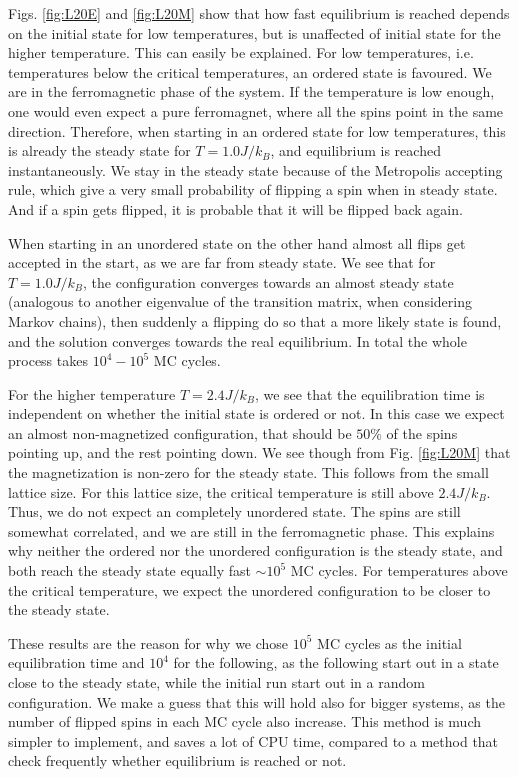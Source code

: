 \documentclass[%
 reprint,
nofootinbib,
aps,
]{revtex4-1}
\begin{document}
Figs. \ref{fig:L20E} and \vref{fig:L20M} show that how fast equilibrium is reached depends on the initial state for low temperatures, but is unaffected of initial state for the higher temperature. This can easily be explained. For low temperatures, i.e. temperatures below the critical temperatures, an ordered state is favoured. We are in the ferromagnetic phase of the system. If the temperature is low enough, one would even expect a pure ferromagnet, where all the spins point in the same direction. Therefore, when starting in an ordered state for low temperatures, this is already the steady state for $T = 1.0J/k_B$, and equilibrium is reached instantaneously. We stay in the steady state because of the Metropolis accepting rule, which  give a very small probability of flipping a spin when in steady state. And if a spin gets flipped, it is probable that it will be flipped back again. 

When starting in an unordered state on the other hand almost all flips get accepted in the start, as we are far from steady state. We see that for $T = 1.0J/k_B$, the configuration converges towards an almost steady state (analogous to another eigenvalue of the transition matrix, when considering Markov chains), then suddenly a flipping do so that a more likely state is found, and the solution converges towards the real equilibrium. In total the whole process takes $10^4-10^5$ MC cycles.

For the higher temperature $T = 2.4J/k_B$, we see that the equilibration time is independent on whether the initial state is ordered or not. In this case we expect an almost non-magnetized configuration, that should be $50\%$ of the spins pointing up, and the rest pointing down. We see though from Fig. \vref{fig:L20M} that the magnetization is non-zero for the steady state. This follows from the small lattice size. For this lattice size, the critical temperature is still above $2.4J/k_B$. Thus, we do not expect an completely unordered state. The spins are still somewhat correlated, and we are still in the ferromagnetic phase. This explains why neither the ordered nor the unordered configuration is the steady state, and both reach the steady state equally fast $\sim 10^5$ MC cycles. For temperatures above the critical temperature, we expect the unordered configuration to be closer to the steady state. 

These results are the reason for why we chose $10^5$ MC cycles as the initial equilibration time and $10^4$ for the following, as the following start out in a state close to the steady state, while the initial run start out in a random configuration. We make a guess that this will hold also for bigger systems, as the number of flipped spins in each MC cycle also increase. This method is much simpler to implement, and saves a lot of CPU time, compared to a method that check frequently whether equilibrium is reached or not.
\end{document}
